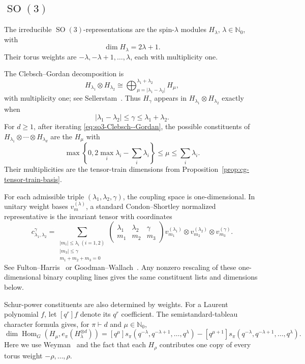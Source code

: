 \documentclass[11pt]{article}
\newcommand{\dsN}{\mathbb{N}}
\newcommand{\HomG}[2]{\operatorname{Hom}_G\!\left(#1,#2\right)}
\newcommand{\SO}{\operatorname{SO}}
\theoremstyle{definition}
\begin{document}
\subsection{\texorpdfstring{$\SO(3)$}{SO(3)}}\label{sec:examples-so3}

The irreducible $\SO(3)$-representations are the spin-$\lambda$ modules $H_\lambda$, $\lambda\in\dsN_0$, with
\[
  \dim H_\lambda=2\lambda+1.
\]
Their torus weights are $-\lambda,-\lambda+1,\dots,\lambda$, each with multiplicity one.

The Clebsch--Gordan decomposition is
\begin{equation}\label{eq:so3-Clebsch--Gordan}
  H_{\lambda_1}\otimes H_{\lambda_2}
  \cong
  \bigoplus_{\mu=|\lambda_1-\lambda_2|}^{\lambda_1+\lambda_2} H_\mu,
\end{equation}
with multiplicity one; see Sellerstam~\cite[Theorem~23]{Sellerstam2019}.
Thus $H_\gamma$ appears in $H_{\lambda_1}\otimes H_{\lambda_2}$ exactly when
\[
  |\lambda_1-\lambda_2|\le\gamma\le\lambda_1+\lambda_2.
\]
For $d\ge 1$, after iterating \eqref{eq:so3-Clebsch--Gordan}, the possible constituents of $H_{\lambda_1}\otimes\cdots\otimes H_{\lambda_d}$ are the $H_\mu$ with
\[
  \max\!\left\{0,2\max_i\lambda_i-\sum_i\lambda_i\right\}
  \le \mu\le
  \sum_i\lambda_i.
\]
Their multiplicities are the tensor-train dimensions from Proposition~\ref{prop:cg-tensor-train-basis}.

For each admissible triple $(\lambda_1,\lambda_2,\gamma)$, the coupling space is one-dimensional.
In unitary weight bases $v_m^{(\lambda)}$, a standard Condon--Shortley normalized representative is the invariant tensor with coordinates
\begin{equation}\label{eq:so3-wigner-3j}
  c_{\lambda_1,\lambda_2}^{\gamma}
  =
  \sum_{\substack{|m_i|\le \lambda_i\ (i=1,2)\\ |m_3|\le \gamma\\ m_1+m_2+m_3=0}}
  \begin{pmatrix}
    \lambda_1 & \lambda_2 & \gamma\\
    m_1 & m_2 & m_3
  \end{pmatrix}
  v_{m_1}^{(\lambda_1)}
  \otimes
  v_{m_2}^{(\lambda_2)}
    \otimes
    v_{m_3}^{(\gamma)}.
\end{equation}
See Fulton--Harris~\cite[\S4.2]{FH1991} or Goodman--Wallach~\cite[Chapter~8]{GW2009}.
Any nonzero rescaling of these one-dimensional binary coupling lines gives the same constituent lists and dimensions below.

Schur-power constituents are also determined by weights.
For a Laurent polynomial $f$, let $[q^r]f$ denote its $q^r$ coefficient.
The semistandard-tableau character formula gives, for $\pi\vdash d$ and $\mu\in\dsN_0$,
\begin{equation}\label{eq:so3-schur-multiplicity}
  \dim\HomG{H_\mu}{e_\pi(H_\lambda^{\otimes d})}
  =
  [q^\mu]s_\pi\!\left(q^{-\lambda},q^{-\lambda+1},\dots,q^\lambda\right)
  -
  [q^{\mu+1}]s_\pi\!\left(q^{-\lambda},q^{-\lambda+1},\dots,q^\lambda\right).
\end{equation}
Here we use Weyman~\cite[Proposition~2.1.15(b)]{Weyman2003} and the fact that each $H_\rho$ contributes one copy of every torus weight $-\rho,\dots,\rho$.
\end{document}
